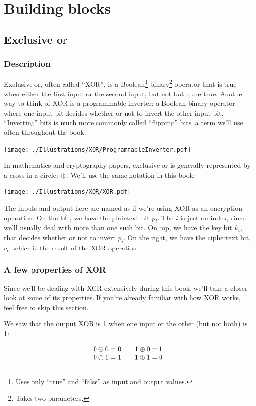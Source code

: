 \documentclass[11pt,ebook,table,dvipsnames]{memoir}
\begin{document}
\part{Building blocks}
\label{sec-2}
\chapter{Exclusive or}
\label{sec-2-1}
\section{Description}
\label{sec-2-1-1}
Exclusive or, often called \enquote{XOR}, is a Boolean\footnote{Uses only \enquote{true}
and \enquote{false} as input and output values.} binary\footnote{Takes two
parameters.} operator that is true when either the first input or the
second input, but not both, are true. Another way to think of XOR is a
programmable inverter: a Boolean binary operator where one input bit
decides whether or not to invert the other input bit. \enquote{Inverting} bits
is much more commonly called \enquote{flipping} bits, a term we'll use often
throughout the book.

\texttt{[image: ./Illustrations/XOR/ProgrammableInverter.pdf]}

In mathematics and cryptography papers, exclusive or is generally
represented by a cross in a circle: $\oplus$. We'll use the same
notation in this book:

\texttt{[image: ./Illustrations/XOR/XOR.pdf]}

The inputs and output here are named as if we're using XOR as an
encryption operation. On the left, we have the plaintext bit $p_i$.
The $i$ is just an index, since we'll usually deal with more than one
such bit. On top, we have the key bit $k_i$, that decides whether or
not to invert $p_i$. On the right, we have the ciphertext bit, $c_i$,
which is the result of the XOR operation.
\section{A few properties of XOR}
\label{sec-2-1-2}

Since we'll be dealing with XOR extensively during this book, we'll
take a closer look at some of its properties. If you're already
familiar with how XOR works, feel free to skip this section.

We saw that the output XOR is 1 when one input or the other (but not
both) is 1:

\[
\begin{array}{c@{\hspace{2em}}c}
0 \xor 0 = 0 & 1 \xor 0 = 1 \\
0 \xor 1 = 1 & 1 \xor 1 = 0
\end{array}
\]
\end{document}
